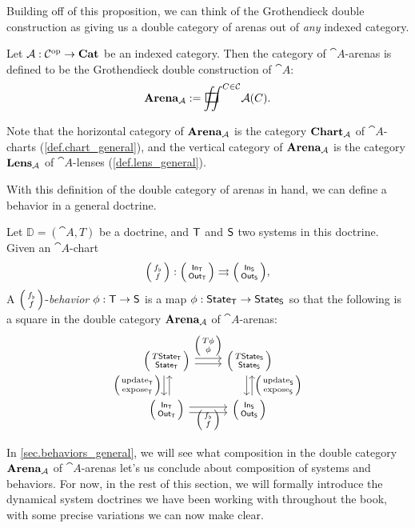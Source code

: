 \documentclass[DynamicalBook]{subfiles}
\begin{document}
Building off of this proposition, we can think of the Grothendieck double
construction as giving us a double category of arenas out of \emph{any} indexed
category.

\begin{definition}\label{def.double_cat_of_arenas_general}
  Let $\mathcal{A} : \mathcal{C}^{\textnormal{op}} \to \textbf{Cat}$ be an indexed category. Then the
  category of $\cat{A}$-arenas is defined to be the Grothendieck double
  construction of $\cat{A}$:
$$\Cat{Arena}_{\cat{A}} := \sqiint^{C \in \cat{C}} \cat{A}(C).$$

  Note that the horizontal category of $\textbf{Arena}_{\mathcal{A}}$ is the category
  $\textbf{Chart}_{\mathcal{A}}$ of $\cat{A}$-charts (\cref{def.chart_general}), and the vertical category of
  $\textbf{Arena}_{\mathcal{A}}$ is the category $\textbf{Lens}_{\mathcal{A}}$ of
  $\cat{A}$-lenses (\cref{def.lens_general}).
\end{definition}

With this definition of the double category of arenas in hand, we can define a
behavior in a general doctrine.
\begin{definition}
 Let $\mathbb{D} = (\cat{A}, T)$ be a doctrine, and $\mathsf{T}$ and $\mathsf{S}$ two
 systems in this doctrine. Given an $\cat{A}$-chart
 \[
\lens{f_{\flat}}{f} : \lens{\In{T}}{\Out{T}} \rightrightarrows \lens{\In{S}}{\Out{S}},
 \]
 A $\lens{f_{\flat}}{f}$-\emph{behavior} $\phi : \mathsf{T} \to \mathsf{S}$
 is a map $\phi : \mathsf{State}_{\mathsf{T}} \to \mathsf{State}_{\mathsf{S}}$ so that the following is a square in
 the double category $\textbf{Arena}_{\mathcal{A}}$ of $\cat{A}$-arenas:
 \[
    \begin{tikzcd}
      \lens{T\State{T}}{\State{T}} \ar[r, shift left, "\lens{T\phi}{\phi}"] \ar[r, shift right] \ar[d, shift right,
      "\lens{\update{T}}{\expose{T}}"'] \ar[d, shift left, leftarrow] &
      \lens{T\State{S}}{\State{S}} \ar[d, shift left, leftarrow,
      "\lens{\update{S}}{\expose{S}}"] \ar[d, shift right]\\
      \lens{\In{T}}{\Out{T}} \ar[r, shift right] \ar[r,
      shift left, "\lens{f_{\flat}}{f}"'] & \lens{\In{S}}{\Out{S}}
    \end{tikzcd}
 \]
\end{definition}

In \cref{sec.behaviors_general}, we will see what composition in the double
category $\textbf{Arena}_{\mathcal{A}}$ of $\cat{A}$-arenas let's us conclude about
composition of systems and behaviors. For now, in the rest of this section, we will formally introduce the dynamical system
doctrines we have been working with throughout the book, with some precise
variations we can now make clear.
\end{document}
